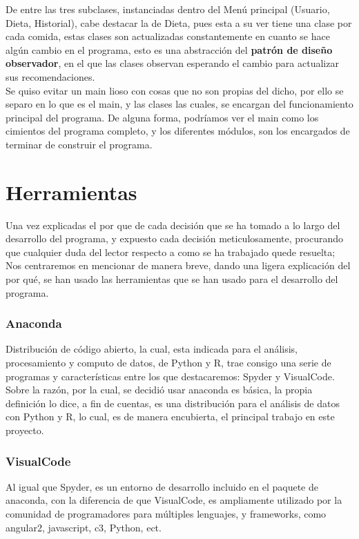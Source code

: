 De entre las tres subclases, instanciadas dentro del Menú principal (Usuario, Dieta, Historial), cabe destacar la de Dieta, pues esta a su ver tiene una clase por cada comida, estas clases son actualizadas constantemente en cuanto se hace algún cambio en el programa, esto es una abstracción del \textbf{ patrón de diseño observador}, en el que las clases observan esperando el cambio para actualizar sus recomendaciones.\\

Se quiso evitar un main lioso con cosas que no son propias del dicho, por ello se separo en lo que es el main, y las clases las cuales, se encargan del funcionamiento principal del programa. De alguna forma, podríamos ver el main como los cimientos del programa completo, y los diferentes módulos, son los encargados de terminar de construir el programa.
\section{Herramientas}
Una vez explicadas el por que de cada decisión que se ha tomado a lo largo del desarrollo del programa, y expuesto cada decisión meticulosamente, procurando que cualquier duda del lector respecto a como se ha trabajado quede resuelta; Nos centraremos en mencionar de manera breve, dando una ligera explicación del por qué, se han usado las herramientas que se han usado para el desarrollo del programa.
\subsubsection{Anaconda}
Distribución de código abierto, la cual, esta indicada para el análisis, procesamiento y computo de datos, de Python y R, trae consigo una serie de programas y características entre los que destacaremos: Spyder y VisualCode.\\

Sobre la razón, por la cual, se decidió usar anaconda es básica, la propia definición lo dice, a fin de cuentas, es una distribución para el análisis de datos con Python y R, lo cual, es de manera encubierta, el principal trabajo en este proyecto.
\subsubsection{VisualCode}
Al igual que Spyder, es un entorno de desarrollo incluido en el paquete de anaconda, con la diferencia de que VisualCode, es ampliamente utilizado por la comunidad de programadores para múltiples lenguajes, y frameworks, como angular2, javascript, c3, Python, ect.\\

